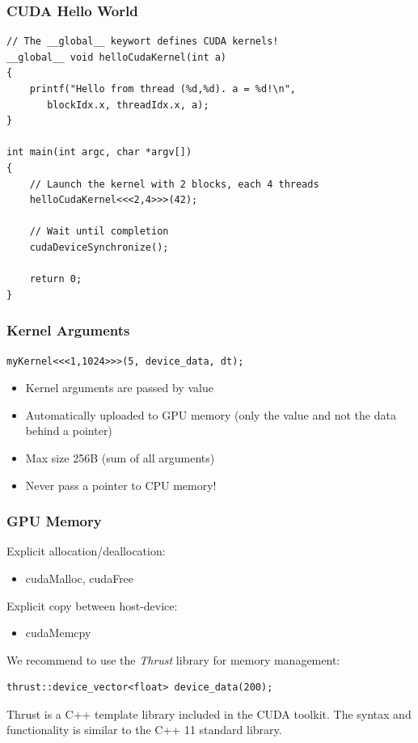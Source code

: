 \documentclass[aspectratio=169]{beamer}
\begin{document}
\begin{frame}[fragile]
\frametitle{CUDA Hello World}
\begin{lstlisting}
// The __global__ keywort defines CUDA kernels!
__global__ void helloCudaKernel(int a)
{
	printf("Hello from thread (%d,%d). a = %d!\n", 
	   blockIdx.x, threadIdx.x, a);
}

int main(int argc, char *argv[])
{
	// Launch the kernel with 2 blocks, each 4 threads
	helloCudaKernel<<<2,4>>>(42);
	
	// Wait until completion
	cudaDeviceSynchronize();
	
	return 0;
}
\end{lstlisting}
\end{frame}


\begin{frame}[fragile]
\frametitle{Kernel Arguments}

\begin{lstlisting} 
myKernel<<<1,1024>>>(5, device_data, dt);
\end{lstlisting}

\begin{itemize}
	\item Kernel arguments are passed by value
	\item Automatically uploaded to GPU memory (only the value and not the data behind a pointer)
	\item Max size 256B (sum of all arguments)
	\item Never pass a pointer to CPU  memory!
\end{itemize}
\end{frame}


\begin{frame}[fragile]
	\frametitle{GPU Memory}
	Explicit allocation/deallocation:
	\begin{itemize}
		\item cudaMalloc, cudaFree
	\end{itemize}
	Explicit copy between host-device:
	\begin{itemize}
		\item cudaMemcpy
	\end{itemize}
	We recommend to use the \textit{Thrust} library for memory management:
\begin{lstlisting}
thrust::device_vector<float> device_data(200);
\end{lstlisting}

\begin{mdframed}[frametitle=Note:]
	Thrust is a C++ template library included in the CUDA toolkit. The syntax and functionality is similar to the C++ 11 standard library.
\end{mdframed}
	
\end{frame}
\end{document}
